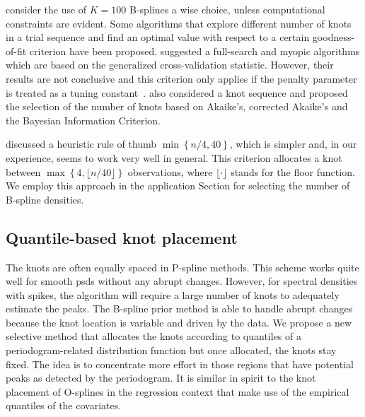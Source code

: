 \documentclass[twocolumn,final]{svjour3}
\begin{document}
\cite{Eilers2015} consider the use of $K=100$ B-splines a wise choice, unless computational constraints are evident.  Some algorithms that explore different number of knots in a trial sequence and find an optimal value with respect to a certain goodness-of-fit criterion have been proposed. \cite{Ruppert2002} suggested a full-search and myopic algorithms which are based on the generalized cross-validation statistic.  However, their results are not conclusive and this criterion only applies if the penalty parameter is treated as a tuning constant~\citep{Kauermann2011}.  \cite{Likhachev2017} also considered a knot sequence and proposed the selection of the number of knots based on  Akaike's, corrected Akaike's and
the Bayesian Information Criterion.

\cite{Ruppert2002} discussed a heuristic rule of thumb $\min\left\{n/4, 40\right\}$, which is simpler and, in our experience, seems to work very well in general.  This criterion allocates a knot between $\max\left\{ 4, \lfloor n/40 \rfloor \right\}$ observations, where $\lfloor \cdot \rfloor$ stands for the floor function.  We employ this approach in the application Section for selecting the number of B-spline densities.


\subsection*{Quantile-based knot placement}

The knots are often equally spaced in P-spline methods.  This scheme works quite well  for smooth psds without any abrupt changes.  However, for spectral densities with spikes, the algorithm will require a large number of knots to adequately estimate the peaks.  The B-spline prior method is able to handle abrupt changes because the knot location is variable and  driven by the data.  We propose a new selective method that allocates the knots according to quantiles of a periodogram-related distribution function but once allocated, the knots stay fixed.  The idea is to concentrate more effort in those regions that have potential peaks as detected by the periodogram.  It is similar in spirit to the knot placement of O-splines \citep{WandOrmerod} in the regression context that make use of the empirical quantiles of the covariates. 
\end{document}
